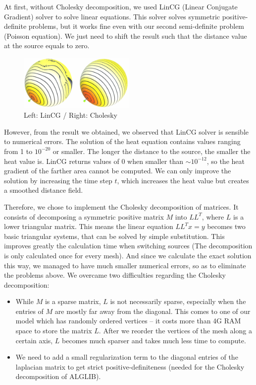 \documentclass[a4paper,12pt,twoside]{article}
\begin{document}
At first, without Cholesky decomposition, we used LinCG (Linear Conjugate Gradient) solver to solve linear equations. This solver solves symmetric positive-definite problems, but it works fine even with our second semi-definite problem (Poisson equation). We just need to shift the result such that the distance value at the source equals to zero.

\begin{figure}
	\centering
	\includegraphics[width=0.5\textwidth]{P1.png}
	\caption{Left: LinCG / Right: Cholesky}
\end{figure}


However, from the result we obtained, we observed that LinCG solver is sensible to numerical errors. The solution of the heat equation contains values ranging from 1 to $10^{-20}$ or smaller. The longer the distance to the source, the smaller the heat value is. LinCG returns values of 0 when smaller than $\sim 10^{-12}$, so the heat gradient of the farther area cannot be computed. We can only improve the solution by increasing the time step $t$, which increases the heat value but creates a smoothed distance field.

Therefore, we chose to implement the Cholesky decomposition of matrices. It consists of decomposing a symmetric positive matrix $M$ into $LL^T$, where $L$ is a lower triangular matrix. This means the linear equation $LL^Tx = y$ becomes two basic triangular systems, that can be solved by simple substitution. This improves greatly the calculation time when switching sources (The decomposition is only calculated once for every mesh). And since we calculate the exact solution this way, we managed to have much smaller numerical errors, so as to eliminate the problems above. 
We overcame two difficulties regarding the Cholesky decomposition: 

\begin{itemize}
\item
While $M$ is a sparse matrix, $L$ is not necessarily sparse, especially when the entries of $M$ are mostly far away from the diagonal. This comes to one of our model which has randomly ordered vertices – it costs more than 4G RAM space to store the matrix $L$. After we reorder the vertices of the mesh along a certain axis, $L$ becomes much sparser and takes much less time to compute.
\item
We need to add a small regularization term to the diagonal entries of the laplacian matrix to get strict positive-definiteness (needed for the Cholesky decomposition of ALGLIB).
\end{itemize}
\end{document}
